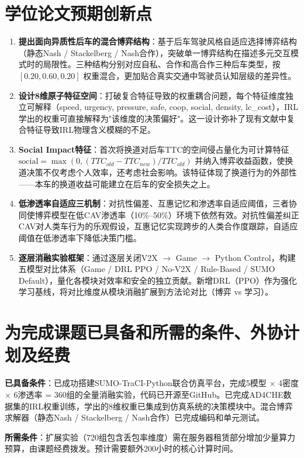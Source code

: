 \section{学位论文预期创新点}
\begin{enumerate}
    \item \textbf{提出面向异质性后车的混合博弈结构}：基于后车驾驶风格自适应选择博弈结构（静态Nash / Stackelberg / Nash合作），突破单一博弈结构在描述多元交互模式时的局限性。三种结构分别对应自私、合作和高合作三种后车类型，按 $[0.20, 0.60, 0.20]$ 权重混合，更加贴合真实交通中驾驶员认知层级的差异性。
    \item \textbf{设计8维原子特征空间}：打破复合特征导致的权重耦合问题，每个特征维度独立可解释（speed, urgency, pressure, safe, coop, social, density, lc\_cost），IRL学出的权重可直接解释为"该维度的决策偏好"。这一设计弥补了现有文献中复合特征导致IRL物理含义模糊的不足。
    \item \textbf{Social Impact特征}：首次将换道对后车TTC的空间侵占量化为可计算特征 $\text{social} = \max(0, (TTC_{old} - TTC_{new}) / TTC_{old})$ 并纳入博弈收益函数，使换道决策不仅考虑个人效率，还考虑社会影响。该特征体现了换道行为的外部性——本车的换道收益可能建立在后车的安全损失之上。
    \item \textbf{低渗透率自适应三机制}：对抗性偏差、互惠记忆和渗透率自适应阈值，三者协同使博弈模型在低CAV渗透率（10\%--50\%）环境下依然有效。对抗性偏差纠正CAV对人类车行为的乐观假设，互惠记忆实现跨步的人类合作度跟踪，自适应阈值在低渗透率下降低决策门槛。
    \item \textbf{逐层消融实验框架}：通过逐层关闭V2X $\rightarrow$ Game $\rightarrow$ Python Control，构建五模型对比体系（Game / DRL PPO / No-V2X / Rule-Based / SUMO Default），量化各模块对效率和安全的独立贡献。新增DRL（PPO）作为强化学习基线，将对比维度从模块消融扩展到方法论对比（博弈 vs 学习）。
\end{enumerate}

\section{为完成课题已具备和所需的条件、外协计划及经费}
\textbf{已具备条件}：已成功搭建SUMO-TraCI-Python联合仿真平台，完成5模型 $\times$ 4密度 $\times$ 6渗透率 = 360组的全量消融实验，代码已开源至GitHub。已完成AD4CHE数据集的IRL权重训练，学出的8维权重已集成到仿真系统的决策模块中。混合博弈求解器（静态Nash / Stackelberg / Nash合作）已完成编码和单元测试。

\textbf{所需条件}：扩展实验（720组包含丢包率维度）需在服务器租赁部分增加少量算力预算，由课题经费拨发。预计需要额外200小时的核心计算时间。

